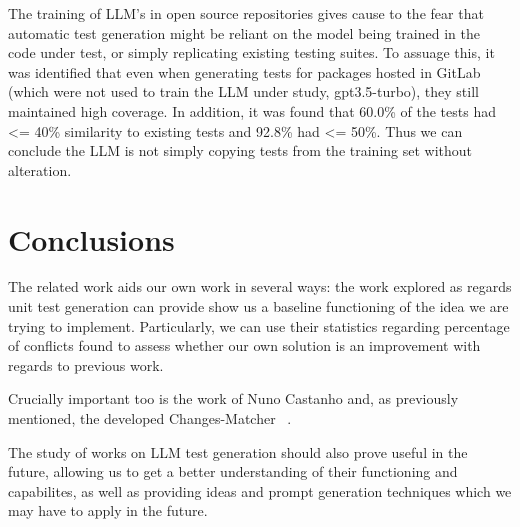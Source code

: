 The training of LLM's in open source repositories gives cause to the fear that automatic test generation might be reliant on the model being trained in the code under test, or simply replicating existing testing suites. To assuage this, it was identified that even when generating tests for packages hosted in GitLab (which were not used to train the LLM under study, gpt3.5-turbo), they still maintained high coverage. In addition, it was found that 60.0\% of the tests had <= 40\% similarity to existing tests and 92.8\% had <= 50\%. Thus we can conclude the LLM is not simply copying tests from the training set without alteration\citep{kn:max}.


\section{Conclusions}


The related work aids our own work in several ways: the work explored as regards unit test generation can provide show us a baseline functioning of the idea we are trying to implement. Particularly, we can use their statistics regarding percentage of conflicts found to assess whether our own solution is an improvement with regards to previous work.

Crucially important too is the work of Nuno Castanho and, as previously mentioned, the developed Changes-Matcher ~\citep{kn:nuno}.

The study of works on LLM test generation should also prove useful in the future, allowing us to get a better understanding of their functioning and capabilites, as well as providing ideas and prompt generation techniques which we may have to apply in the future.